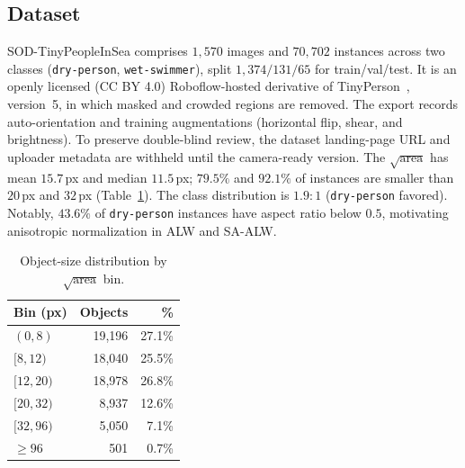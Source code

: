 
\subsection{Dataset}
\label{sec:exp-dataset}

SOD-TinyPeopleInSea comprises $1{,}570$ images and $70{,}702$ instances
across two classes (\texttt{dry-person}, \texttt{wet-swimmer}), split
$1{,}374/131/65$ for train/val/test. It is an openly licensed (CC BY 4.0)
Roboflow-hosted derivative of TinyPerson~\cite{yu2020tinyperson}, version~5,
in which masked and crowded regions are removed. The export records
auto-orientation and training augmentations (horizontal flip, shear, and
brightness). To preserve double-blind review, the dataset landing-page URL
and uploader metadata are withheld until the camera-ready version. The
$\sqrt{\text{area}}$ has mean $15.7$\,px and median $11.5$\,px; $79.5\%$
and $92.1\%$ of instances are smaller than $20$\,px and $32$\,px
(Table~\ref{tab:exp-eda}). The class distribution is $1.9:1$
(\texttt{dry-person} favored). Notably, $43.6\%$ of \texttt{dry-person}
instances have aspect ratio below $0.5$, motivating anisotropic normalization
in ALW and SA-ALW.

\begin{table}[t]
\centering
\caption{Object-size distribution by $\sqrt{\text{area}}$ bin.}
\label{tab:exp-eda}
\small
\begin{tabular}{lrr}
\toprule
Bin (px) & Objects & \% \\
\midrule
$(0,8)$    & 19{,}196 & 27.1\% \\
$[8,12)$   & 18{,}040 & 25.5\% \\
$[12,20)$  & 18{,}978 & 26.8\% \\
$[20,32)$  & 8{,}937  & 12.6\% \\
$[32,96)$  & 5{,}050  & 7.1\% \\
$\geq 96$  & 501     & 0.7\% \\
\bottomrule
\end{tabular}
\end{table}

